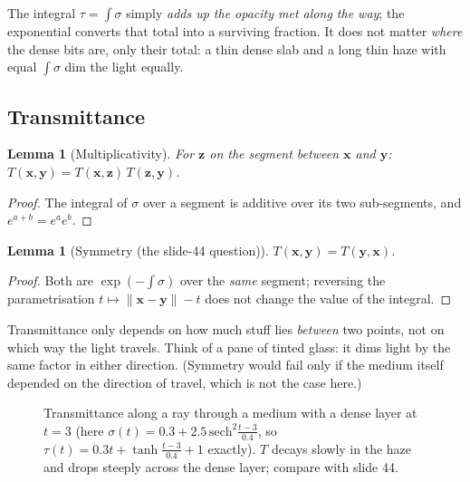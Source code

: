 \documentclass[11pt,a4paper]{article}
\newcommand{\x}{{\bm{x}}}
\newcommand{\y}{\bm{y}}
\newcommand{\z}{\bm{z}}
\theoremstyle{definition}
\theoremstyle{plain}
\newtheorem{lemma}[definition]{Lemma}
\theoremstyle{remark}
\begin{document}
\begin{intuition}
The integral $\tau=\int\sigma$ simply \emph{adds up the opacity met along the way}; the exponential converts that total into a surviving fraction. It does not matter \emph{where} the dense bits are, only their total: a thin dense slab and a long thin haze with equal $\int\sigma$ dim the light equally.
\end{intuition}

\subsection{Transmittance}

\begin{lemma}[Multiplicativity]\label{lem:mult}
For $\z$ on the segment between $\x$ and $\y$: $T(\x,\y)=T(\x,\z)\,T(\z,\y)$.
\end{lemma}
\begin{proof}
The integral of $\sigma$ over a segment is additive over its two sub-segments, and $e^{a+b}=e^ae^b$.
\end{proof}

\begin{lemma}[Symmetry (the slide-44 question)]\label{lem:sym}
$T(\x,\y)=T(\y,\x)$.
\end{lemma}
\begin{proof}
Both are $\exp(-\int\sigma)$ over the \emph{same} segment; reversing the parametrisation $t\mapsto\|\x-\y\|-t$ does not change the value of the integral.
\end{proof}

\begin{intuition}
Transmittance only depends on how much stuff lies \emph{between} two points, not on which way the light travels. Think of a pane of tinted glass: it dims light by the same factor in either direction. (Symmetry would fail only if the medium itself depended on the direction of travel, which is not the case here.)
\end{intuition}

\begin{figure}[h]
\centering
{}
\caption{Transmittance along a ray through a medium with a dense layer at $t=3$ (here $\sigma(t)=0.3+2.5\,\mathrm{sech}^2\frac{t-3}{0.4}$, so $\tau(t)=0.3t+\tanh\frac{t-3}{0.4}+1$ exactly). $T$ decays slowly in the haze and drops steeply across the dense layer; compare with slide 44.}
\end{figure}
\end{document}
